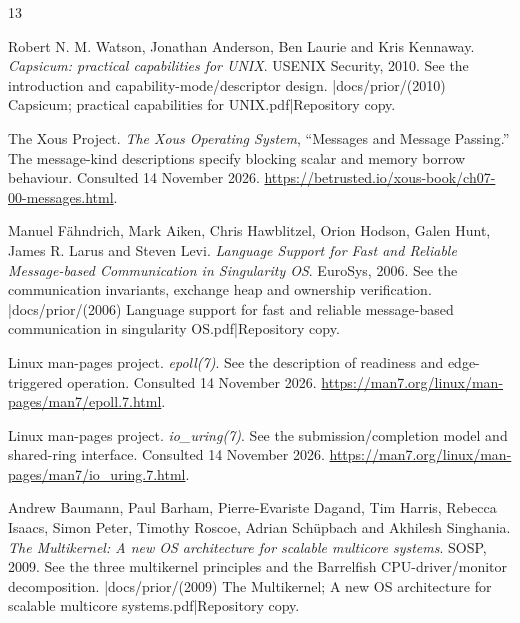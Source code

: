 \renewcommand{\bibname}{Sources for Architectural Comparisons}
\begin{thebibliography}{13}
\setlength{\itemsep}{0.25\baselineskip}
\setlength{\parsep}{0pt}

Robert N. M. Watson, Jonathan Anderson, Ben Laurie and Kris Kennaway.
\emph{Capsicum: practical capabilities for UNIX}. USENIX Security, 2010.
See the introduction and capability-mode/descriptor design.
\repofiletext|docs/prior/(2010) Capsicum; practical capabilities for UNIX.pdf|{Repository copy.}

The Xous Project. \emph{The Xous Operating System}, ``Messages and Message
Passing.'' The message-kind descriptions specify blocking scalar and memory
borrow behaviour. Consulted 14 November 2026.
\url{https://betrusted.io/xous-book/ch07-00-messages.html}.

Manuel F\"ahndrich, Mark Aiken, Chris Hawblitzel, Orion Hodson, Galen Hunt,
James R. Larus and Steven Levi.
\emph{Language Support for Fast and Reliable Message-based Communication in
Singularity OS}. EuroSys, 2006. See the communication invariants, exchange
heap and ownership verification.
\repofiletext|docs/prior/(2006) Language support for fast and reliable message-based communication in singularity OS.pdf|{Repository copy.}

Linux man-pages project. \emph{epoll(7)}. See the description of readiness
and edge-triggered operation. Consulted 14 November 2026.
\url{https://man7.org/linux/man-pages/man7/epoll.7.html}.

Linux man-pages project. \emph{io\_uring(7)}. See the submission/completion
model and shared-ring interface. Consulted 14 November 2026.
\url{https://man7.org/linux/man-pages/man7/io_uring.7.html}.

Andrew Baumann, Paul Barham, Pierre-Evariste Dagand, Tim Harris,
Rebecca Isaacs, Simon Peter, Timothy Roscoe, Adrian Sch\"upbach and
Akhilesh Singhania.
\emph{The Multikernel: A new OS architecture for scalable multicore systems}.
SOSP, 2009. See the three multikernel principles and the Barrelfish
CPU-driver/monitor decomposition.
\repofiletext|docs/prior/(2009) The Multikernel; A new OS architecture for scalable multicore systems.pdf|{Repository copy.}


\end{thebibliography}

